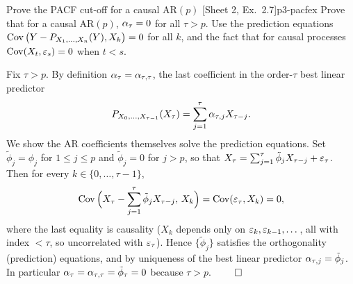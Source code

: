 \begin{exercise}{Prove the PACF cut-off for a causal $\mathrm{AR}(p)$ \quad\textnormal{[Sheet 2, Ex.~2.7]}}{p3-pacfex}
Prove that for a causal $\mathrm{AR}(p)$, $\alpha_\tau=0$ for all $\tau>p$.
Use the prediction equations
$\operatorname{Cov}\big(Y-P_{X_1,\dots,X_n}(Y),X_k\big)=0$ for all $k$, and the fact that for
causal processes $\operatorname{Cov}(X_t,\varepsilon_s)=0$ when $t<s$.
\end{exercise}
\begin{solution}
Fix $\tau>p$. By definition $\alpha_\tau=\alpha_{\tau,\tau}$, the last coefficient
in the order-$\tau$ best linear predictor
\[
P_{X_0,\dots,X_{\tau-1}}(X_\tau)=\sum_{j=1}^{\tau}\alpha_{\tau,j}X_{\tau-j}.
\]
We show the AR coefficients themselves solve the prediction equations. Set
$\tilde\phi_j=\phi_j$ for $1\le j\le p$ and $\tilde\phi_j=0$ for $j>p$, so that
$X_\tau=\sum_{j=1}^{\tau}\tilde\phi_j X_{\tau-j}+\varepsilon_\tau$. Then for every
$k\in\{0,\dots,\tau-1\}$,
\[
\operatorname{Cov}\Big(X_\tau-\sum_{j=1}^{\tau}\tilde\phi_j X_{\tau-j},\,X_k\Big)
=\operatorname{Cov}(\varepsilon_\tau,X_k)=0,
\]
where the last equality is causality ($X_k$ depends only on
$\varepsilon_k,\varepsilon_{k-1},\dots$, all with index $<\tau$, so uncorrelated with
$\varepsilon_\tau$). Hence $\{\tilde\phi_j\}$ satisfies the orthogonality (prediction)
equations, and by uniqueness of the best linear predictor
$\alpha_{\tau,j}=\tilde\phi_j$. In particular
$\alpha_\tau=\alpha_{\tau,\tau}=\tilde\phi_\tau=0$ because $\tau>p$. $\qed$
\end{solution}

